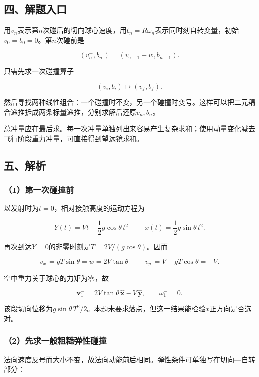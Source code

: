 \documentclass[12pt,a4paper,fontset=fandol]{ctexart}
\begin{document}
\subsection{四、解题入口}\label{ux56dbux89e3ux9898ux5165ux53e3-2}

用\(v_n\)表示第\(n\)次碰后的切向球心速度，用\(b_n=R\omega_n\)表示同时刻自转变量，初始\(v_0=b_0=0\)。第\(n\)次碰前是

\[
(v_n^-,b_n^-)=(v_{n-1}+w,b_{n-1}).
\]

只需先求一次碰撞算子

\[
(v_i,b_i)\longmapsto(v_f,b_f).
\]

然后寻找两种线性组合：一个碰撞时不变，另一个碰撞时变号。这样可以把二元耦合递推拆成两条标量递推，分别求解后还原\(v_n,b_n\)。

总冲量应在最后求。每一次冲量单独列出来容易产生复杂求和；使用动量变化减去飞行阶段重力冲量，可直接得到望远镜求和。

\subsection{五、解析}\label{ux4e94ux89e3ux6790-2}

\subsubsection{（1）第一次碰撞前}\label{ux7b2cux4e00ux6b21ux78b0ux649eux524d}

以发射时为\(t=0\)，相对接触高度的运动方程为

\[
Y(t)=Vt-\frac12g\cos\theta\,t^2,
\qquad x(t)=\frac12g\sin\theta\,t^2.
\]

再次到达\(Y=0\)的非零时刻是\(T=2V/(g\cos\theta)\)。因而

\[
v_x^-=gT\sin\theta=w=2V\tan\theta,
\qquad v_y^-=V-gT\cos\theta=-V.
\]

空中重力关于球心的力矩为零，故

\[
\boxed{\boldsymbol v_1^-
=2V\tan\theta\,\hat{\boldsymbol x}
-V\,\hat{\boldsymbol y},\qquad\omega_1^-=0}.
\]

该段切向位移为\(g\sin\theta\,T^2/2\)。本题未要求落点，但这一结果能检验\(x\)正方向是否选对。

\subsubsection{（2）先求一般粗糙弹性碰撞}\label{ux5148ux6c42ux4e00ux822cux7c97ux7cd9ux5f39ux6027ux78b0ux649e}

法向速度反号而大小不变，故法向动能前后相同。弹性条件可单独写在切向---自转部分：
\end{document}
